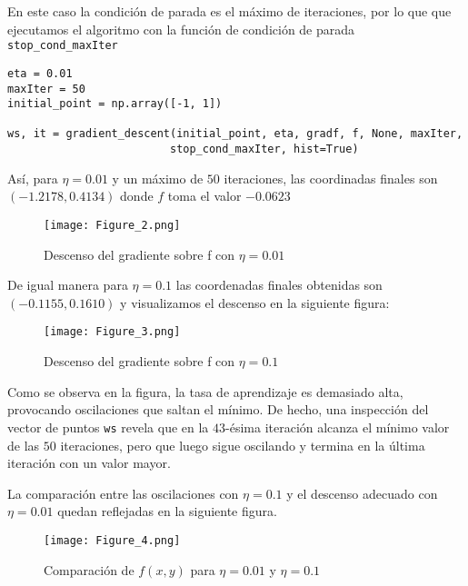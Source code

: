 En este caso la condición de parada es el máximo de iteraciones, por lo que
que ejecutamos el algoritmo con la función de condición de parada
\texttt{stop_cond_maxIter}

\begin{verbatim}
eta = 0.01 
maxIter = 50
initial_point = np.array([-1, 1])

ws, it = gradient_descent(initial_point, eta, gradf, f, None, maxIter,
                         stop_cond_maxIter, hist=True)

\end{verbatim}

Así, para $\eta=0.01$ y un máximo de $50$ iteraciones, las coordinadas finales
son $(-1.2178, 0.4134)$ donde $f$ toma el valor $-0.0623$

\begin{figure}[H]
\centering
\texttt{[image: Figure\_2.png]}
\caption{Descenso del gradiente sobre f con $\eta=0.01$}
\end{figure}

De igual manera para $\eta=0.1$ las coordenadas finales obtenidas son 
$(-0.1155, 0.1610)$ y visualizamos el descenso en la siguiente figura:

\begin{figure}[H]
\centering
\texttt{[image: Figure\_3.png]}
\caption{Descenso del gradiente sobre f con $\eta=0.1$}
\end{figure}

Como se observa en la figura, la tasa de aprendizaje es demasiado alta,
provocando oscilaciones que saltan el mínimo. De hecho, una inspección del
vector de puntos \texttt{ws} revela que en la $43$-ésima iteración
alcanza el mínimo valor de las $50$ iteraciones, pero que luego sigue oscilando y
termina en la última iteración con un valor mayor.

La comparación entre las oscilaciones con $\eta=0.1$ y el descenso adecuado con 
$\eta=0.01$ quedan reflejadas en la siguiente figura.

\begin{figure}[H]
  \centering
  \texttt{[image: Figure\_4.png]}
  \caption{Comparación de $f(x,y)$ para $\eta=0.01$ y $\eta=0.1$}
\end{figure}


